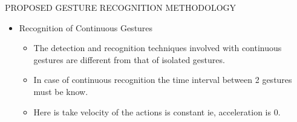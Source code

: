 \documentclass{beamer}
\begin{document}
%
%
%
%
%
%


\begin{frame}{PROPOSED GESTURE RECOGNITION
METHODOLOGY}
\begin{itemize}
\item Recognition of Continuous Gestures
\linebreak
\begin{itemize}
\item The detection and recognition techniques involved with
continuous gestures are different from that of isolated gestures. 
\linebreak
\item In case of continuous recognition the time interval between 2 gestures must be know.
\linebreak
\item Here is take velocity of the actions is constant ie, acceleration is 0.

\end{itemize}
\end{itemize}
\end{frame}
\end{document}
